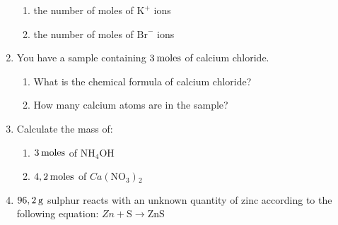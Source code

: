 \begin{enumerate}[noitemsep, label=\textbf{\arabic*}. ]
\label{m38717*id279964}\begin{enumerate}[noitemsep, label=\textbf{\alph*}. ] 
            \label{m38717*uid56}\item the number of moles of \begin{math}{\mathrm{K}}^{+}\end{math} ions
\label{m38717*uid57}\item the number of moles of \begin{math}{\mathrm{Br}}^{-}\end{math} ions
\end{enumerate}
                \label{m38717*uid58}\item You have a sample containing \begin{math}3\phantom{\rule{2pt}{0ex}}\mathrm{moles}\end{math} of calcium chloride.
\label{m38717*id280031}\begin{enumerate}[noitemsep, label=\textbf{\alph*}. ] 
            \label{m38717*uid59}\item What is the chemical formula of calcium chloride?
\label{m38717*uid60}\item How many calcium atoms are in the sample?
\end{enumerate}
                \label{m38717*uid61}\item Calculate the mass of:
\label{m38717*id280072}\begin{enumerate}[noitemsep, label=\textbf{\alph*}. ] 
            \label{m38717*uid62}\item \begin{math}3\phantom{\rule{2pt}{0ex}}\mathrm{moles}\end{math} of \begin{math}\mathrm{NH}{}_{4}\mathrm{OH}\end{math}
\label{m38717*uid63}\item \begin{math}4,2\phantom{\rule{2pt}{0ex}}\mathrm{moles}\end{math} of \begin{math}Ca\left(\mathrm{NO}{}_{3}\right){}_{2}\end{math}\end{enumerate}
                \label{m38717*uid64}\item \begin{math}96,2\phantom{\rule{2pt}{0ex}}\mathrm{g}\end{math} sulphur reacts with an unknown quantity of zinc according to the following equation:
\begin{math}Zn+\mathrm{S}\to \mathrm{ZnS}\end{math}\label{m38717*id280179}\begin{enumerate}[noitemsep, label=\textbf{\alph*}. ] 

\end{enumerate}
\end{enumerate}
